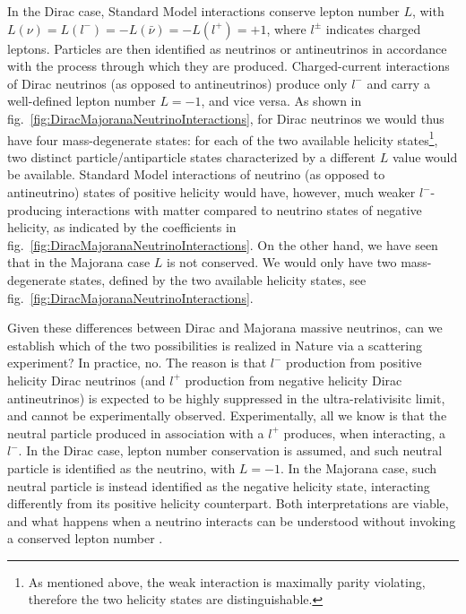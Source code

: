In the Dirac case, Standard Model interactions conserve lepton number $L$, with $L(\nu)=L(l^-)=-L(\bar{\nu})=-L(l^+)=+1$, where $l^{\pm}$ indicates charged leptons. Particles are then identified as neutrinos or antineutrinos in accordance with the process through which they are produced. Charged-current interactions of Dirac neutrinos (as opposed to antineutrinos) produce only $l^-$ and carry a well-defined lepton number $L=-1$, and vice versa. As shown in fig.~\ref{fig:DiracMajoranaNeutrinoInteractions}, for Dirac neutrinos we would thus have four mass-degenerate states: for each of the two available helicity states\footnote{As mentioned above, the weak interaction is maximally parity violating, therefore the two helicity states are distinguishable.}, two distinct particle/antiparticle states characterized by a different $L$ value would be available. Standard Model interactions of neutrino (as opposed to antineutrino) states of positive helicity would have, however, much weaker $l^-$-producing interactions with matter compared to neutrino states of negative helicity, as indicated by the coefficients in fig.~\ref{fig:DiracMajoranaNeutrinoInteractions}. On the other hand, we have seen that in the Majorana case $L$ is not conserved. We would only have two mass-degenerate states, defined by the two available helicity states, see fig.~\ref{fig:DiracMajoranaNeutrinoInteractions}.

Given these differences between Dirac and Majorana massive neutrinos, can we establish which of the two possibilities is realized in Nature via a scattering experiment? In practice, no. The reason is that $l^-$ production from positive helicity Dirac neutrinos (and $l^+$ production from negative helicity Dirac antineutrinos) is expected to be highly suppressed in the ultra-relativisitc limit, and cannot be experimentally observed. Experimentally, all we know is that the neutral particle produced in association with a $l^+$ produces, when interacting, a $l^-$. In the Dirac case, lepton number conservation is assumed, and such neutral particle is identified as the neutrino, with $L=-1$. In the Majorana case, such neutral particle is instead identified as the negative helicity state, interacting differently from its positive helicity counterpart. Both interpretations are viable, and what happens when a neutrino interacts can be understood without invoking a conserved lepton number \cite{Kayser:2002qs}.

